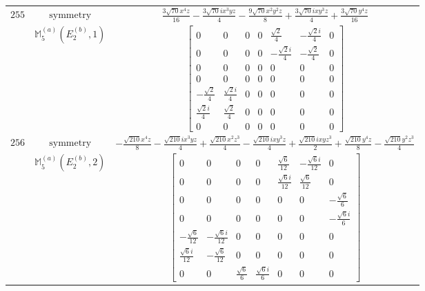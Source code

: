 \documentclass[fleqn,8pt,landscape]{jsarticle}
\begin{document}
\begin{longtable}{ccc}
$ 255 $ & $ \text{symmetry} $ & $ \frac{3 \sqrt{70} x^{4} z}{16} - \frac{3 \sqrt{70} i x^{3} y z}{4} - \frac{9 \sqrt{70} x^{2} y^{2} z}{8} + \frac{3 \sqrt{70} i x y^{3} z}{4} + \frac{3 \sqrt{70} y^{4} z}{16} $ \\
$  $ & $ \mathbb{M}_{5}^{(a)}(E_{2}^{(b)},1) $ & $ \begin{bmatrix} 0 & 0 & 0 & 0 & \frac{\sqrt{2}}{4} & - \frac{\sqrt{2} i}{4} & 0 \\ 0 & 0 & 0 & 0 & - \frac{\sqrt{2} i}{4} & - \frac{\sqrt{2}}{4} & 0 \\ 0 & 0 & 0 & 0 & 0 & 0 & 0 \\ 0 & 0 & 0 & 0 & 0 & 0 & 0 \\ - \frac{\sqrt{2}}{4} & \frac{\sqrt{2} i}{4} & 0 & 0 & 0 & 0 & 0 \\ \frac{\sqrt{2} i}{4} & \frac{\sqrt{2}}{4} & 0 & 0 & 0 & 0 & 0 \\ 0 & 0 & 0 & 0 & 0 & 0 & 0 \end{bmatrix} $ \\ \hline
$ 256 $ & $ \text{symmetry} $ & $ - \frac{\sqrt{210} x^{4} z}{8} - \frac{\sqrt{210} i x^{3} y z}{4} + \frac{\sqrt{210} x^{2} z^{3}}{4} - \frac{\sqrt{210} i x y^{3} z}{4} + \frac{\sqrt{210} i x y z^{3}}{2} + \frac{\sqrt{210} y^{4} z}{8} - \frac{\sqrt{210} y^{2} z^{3}}{4} $ \\
$  $ & $ \mathbb{M}_{5}^{(a)}(E_{2}^{(b)},2) $ & $ \begin{bmatrix} 0 & 0 & 0 & 0 & \frac{\sqrt{6}}{12} & - \frac{\sqrt{6} i}{12} & 0 \\ 0 & 0 & 0 & 0 & \frac{\sqrt{6} i}{12} & \frac{\sqrt{6}}{12} & 0 \\ 0 & 0 & 0 & 0 & 0 & 0 & - \frac{\sqrt{6}}{6} \\ 0 & 0 & 0 & 0 & 0 & 0 & - \frac{\sqrt{6} i}{6} \\ - \frac{\sqrt{6}}{12} & - \frac{\sqrt{6} i}{12} & 0 & 0 & 0 & 0 & 0 \\ \frac{\sqrt{6} i}{12} & - \frac{\sqrt{6}}{12} & 0 & 0 & 0 & 0 & 0 \\ 0 & 0 & \frac{\sqrt{6}}{6} & \frac{\sqrt{6} i}{6} & 0 & 0 & 0 \end{bmatrix} $ \\ \hline
\end{longtable}
\end{document}
